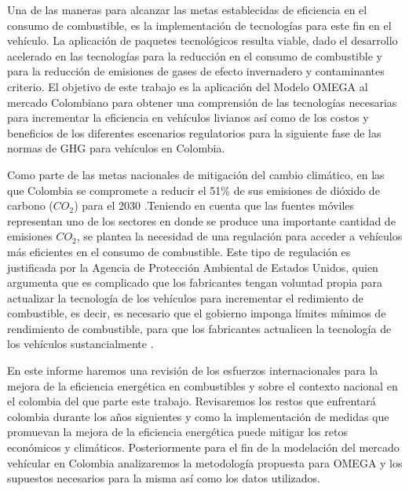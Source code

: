 Una de las maneras para alcanzar las metas establecidas de eficiencia en el consumo de combustible, es la implementación de tecnologías para este fin en el vehículo. La aplicación de paquetes tecnológicos resulta viable, dado el desarrollo acelerado en las tecnologías para la reducción en el consumo de combustible y para la reducción de emisiones de gases de efecto invernadero y contaminantes criterio. El objetivo de este trabajo es la aplicación del Modelo OMEGA al mercado Colombiano para obtener una comprensión de las tecnologías necesarias para incrementar la eficiencia en vehículos livianos así como de los costos y beneficios de los diferentes escenarios regulatorios para la siguiente fase de las normas de GHG para vehículos en Colombia.

Como parte de las metas nacionales de mitigación del cambio climático, en las que Colombia se compromete a reducir el 51\% de sus emisiones de dióxido de carbono ($CO_2$) para el 2030 \cite{}.Teniendo en cuenta que las fuentes móviles representan uno de los sectores en donde se produce una importante cantidad de emisiones $CO_2$, se plantea la necesidad de una regulación para acceder a vehículos más eficientes en el consumo de combustible. Este tipo de regulación es justificada por la Agencia de Protección Ambiental de Estados Unidos, quien argumenta que es complicado que los fabricantes tengan voluntad propia para actualizar la tecnología de los vehículos para incrementar el redimiento de combustible, es decir, es necesario que el gobierno imponga límites mínimos de rendimiento de combustible, para que los fabricantes actualicen la tecnología de los vehículos sustancialmente \cite{EPA_2012-A}. 

En este informe haremos una revisión de los esfuerzos internacionales para la mejora de la eficiencia energética en combustibles y sobre el contexto nacional en el colombia del que parte este trabajo. Revisaremos los restos que enfrentará colombia durante los años siguientes y como la implementación de medidas que promuevan la mejora de la eficiencia energética puede mitigar los retos económicos y climáticos. Posteriormente para el fin de la modelación del mercado vehícular en Colombia analizaremos la metodología propuesta para OMEGA y los supuestos necesarios para la misma así como los datos utilizados.



